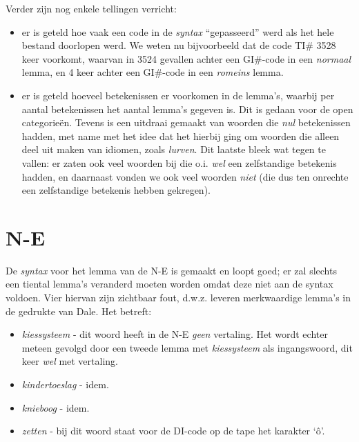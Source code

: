 Verder zijn nog enkele tellingen verricht:
\begin{itemize}
  \item er is geteld hoe vaak een code in de {\em syntax} ``gepasseerd'' werd 
        als het hele bestand doorlopen werd. We weten nu bijvoorbeeld dat de 
        code TI\# 3528 keer voorkomt, waarvan in 3524 gevallen achter een 
        GI\#-code in een {\em normaal} lemma, en 4 keer achter een 
        GI\#-code in een {\em romeins} lemma.

  \item er is geteld hoeveel betekenissen er voorkomen in de lemma's, waarbij
        per aantal betekenissen het aantal lemma's gegeven is. Dit is gedaan
        voor de open categorie\"{e}n. Tevens is een uitdraai gemaakt van woorden
        die {\em nul} betekenissen hadden, met name met het idee dat het 
        hierbij ging om woorden die alleen deel uit maken van idiomen, zoals
        {\em lurven}. Dit laatste bleek wat tegen te vallen: er zaten ook veel
        woorden bij die o.i. {\em wel} een zelfstandige
        betekenis hadden, en daarnaast
        vonden we ook veel woorden {\em niet} (die dus ten onrechte een 
        zelfstandige betekenis hebben gekregen).

\end{itemize}

\section{N-E}

De {\em syntax} voor het lemma van de N-E is gemaakt en loopt goed; er zal
slechts een tiental lemma's veranderd moeten worden omdat deze niet aan de
syntax voldoen. Vier hiervan zijn zichtbaar fout, d.w.z. leveren merkwaardige
lemma's in de gedrukte van Dale. Het betreft:
\begin{itemize}
  \item {\em kiessysteem} - dit woord heeft in de N-E {\em geen} vertaling. Het
                        wordt echter meteen gevolgd door een tweede lemma met
                        {\em kiessysteem} als ingangswoord, dit keer {\em wel}
                        met vertaling.
  \item {\em kindertoeslag} - idem.
  \item {\em knieboog} - idem.
  \item {\em zetten} - bij dit woord staat voor de DI-code op de tape het 
                       karakter `\^{o}'.
\end{itemize}

